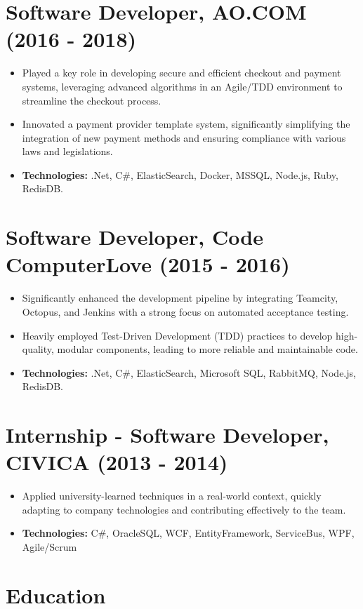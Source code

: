 \documentclass[12pt,a4paper]{res}
\begin{document}
\begin{resume}
\section{\bf Software Developer, AO.COM (2016 - 2018)}
\begin{itemize}
\item Played a key role in developing secure and efficient checkout and payment systems, leveraging advanced algorithms in an Agile/TDD environment to streamline the checkout process.
\item Innovated a payment provider template system, significantly simplifying the integration of new payment methods and ensuring compliance with various laws and legislations.
\item \textbf{Technologies:} .Net, C\#, ElasticSearch, Docker, MSSQL, Node.js, Ruby, RedisDB.
\end{itemize}

\section{\bf Software Developer, Code ComputerLove (2015 - 2016)}
\begin{itemize}
\item Significantly enhanced the development pipeline by integrating Teamcity, Octopus, and Jenkins with a strong focus on automated acceptance testing.
\item Heavily employed Test-Driven Development (TDD) practices to develop high-quality, modular components, leading to more reliable and maintainable code.
\item \textbf{Technologies:} .Net, C\#, ElasticSearch, Microsoft SQL, RabbitMQ, Node.js, RedisDB.
\end{itemize}

\section{\bf Internship - Software Developer, CIVICA (2013 - 2014)}
\begin{itemize}
\item Applied university-learned techniques in a real-world context, quickly adapting to company technologies and contributing effectively to the team.
\item \textbf{Technologies:} C\#, OracleSQL, WCF, EntityFramework, ServiceBus, WPF, Agile/Scrum
\end{itemize}


\section{\large\bf Education}


\end{resume}
\end{document}
